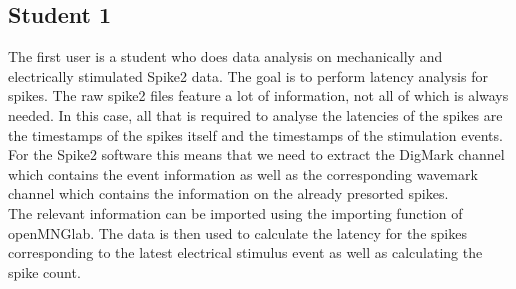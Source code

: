 \subsection{Student 1}

The first user is a student who does data analysis on mechanically and electrically stimulated Spike2 data. The goal is to perform latency analysis for spikes.  The raw spike2 files feature a lot of information, not all of which is always needed. In this case, all that is required to analyse the latencies of the spikes are the timestamps of the spikes itself and the timestamps of the stimulation events. For the Spike2 software this means that we need to extract the DigMark channel which contains the event information as well as the corresponding wavemark channel which contains the information on the already presorted spikes.\\
The relevant information can be imported using the importing function of openMNGlab. 
The data is then used to calculate the latency for the spikes corresponding to the latest electrical stimulus event as well as calculating the spike count.

